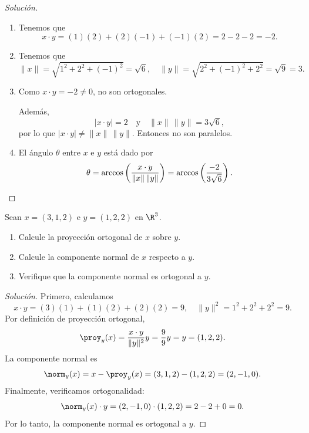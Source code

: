 \documentclass[a4,11pt]{aleph-notas}
\begin{document}
\begin{proof}[Solución]\hspace{0pt}
    \begin{enumerate}
        \item Tenemos que
        \[
            x\cdot y=(1)(2)+(2)(-1)+(-1)(2)=2-2-2=-2.
        \]
        \item Tenemos que
        \[
            \|x\|=\sqrt{1^2+2^2+(-1)^2}=\sqrt{6},
            \quad
            \|y\|=\sqrt{2^2+(-1)^2+2^2}=\sqrt{9}=3.
        \]
        \item
        Como $x\cdot y=-2\neq 0$, no son ortogonales.

        Además,
        \[
            |x\cdot y|=2
            \quad\text{y}\quad
            \|x\|\,\|y\|=3\sqrt{6},
        \]
        por lo que $|x\cdot y|\neq \|x\|\,\|y\|$. Entonces no son paralelos.
        \item
        El ángulo $\theta$ entre $x$ e $y$ está dado por
        \[
            \theta=\arccos\left(\frac{x\cdot y}{\|x\|\,\|y\|}\right)
            =\arccos\left(\frac{-2}{3\sqrt{6}}\right).\qedhere
        \]
    \end{enumerate}
\end{proof}

\begin{ejer}
    Sean $x=(3,1,2)$ e $y=(1,2,2)$ en $\R^3$.
    \begin{enumerate}
        \item Calcule la proyección ortogonal de $x$ sobre $y$.
        \item Calcule la componente normal de $x$ respecto a $y$.
        \item Verifique que la componente normal es ortogonal a $y$.
    \end{enumerate}
\end{ejer}

\begin{proof}[Solución]\hspace{0pt}
    Primero, calculamos
    \[
        x\cdot y=(3)(1)+(1)(2)+(2)(2)=9,
        \quad
        \|y\|^2=1^2+2^2+2^2=9.
    \]
    Por definición de proyección ortogonal,
    \[
        \proy_y(x)=\frac{x\cdot y}{\|y\|^2}y=\frac{9}{9}y=y=(1,2,2).
    \]
    La componente normal es
    \[
        \norm_y(x)=x-\proy_y(x)=(3,1,2)-(1,2,2)=(2,-1,0).
    \]
    Finalmente, verificamos ortogonalidad:
    \[
        \norm_y(x)\cdot y=(2,-1,0)\cdot(1,2,2)=2-2+0=0.
    \]
    Por lo tanto, la componente normal es ortogonal a $y$.
\end{proof}
\end{document}
